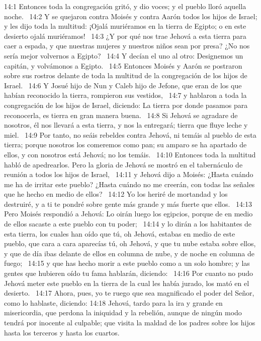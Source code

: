 14:1 Entonces toda la congregación gritó, y dio voces; y el pueblo lloró aquella noche.  
14:2 Y se quejaron contra Moisés y contra Aarón todos los hijos de Israel; y les dijo toda la multitud: ¡Ojalá muriéramos en la tierra de Egipto; o en este desierto ojalá muriéramos!  
14:3 ¿Y por qué nos trae Jehová a esta tierra para caer a espada, y que nuestras mujeres y nuestros niños sean por presa? ¿No nos sería mejor volvernos a Egipto?  
14:4 Y decían el uno al otro: Designemos un capitán, y volvámonos a Egipto.  
14:5 Entonces Moisés y Aarón se postraron sobre sus rostros delante de toda la multitud de la congregación de los hijos de Israel.  
14:6 Y Josué hijo de Nun y Caleb hijo de Jefone, que eran de los que habían reconocido la tierra, rompieron sus vestidos,  
14:7 y hablaron a toda la congregación de los hijos de Israel, diciendo: La tierra por donde pasamos para reconocerla, es tierra en gran manera buena.  
14:8 Si Jehová se agradare de nosotros, él nos llevará a esta tierra, y nos la entregará; tierra que fluye leche y miel.  
14:9 Por tanto, no seáis rebeldes contra Jehová, ni temáis al pueblo de esta tierra; porque nosotros los comeremos como pan; su amparo se ha apartado de ellos, y con nosotros está Jehová; no los temáis.  
14:10 Entonces toda la multitud habló de apedrearlos. Pero la gloria de Jehová se mostró en el tabernáculo de reunión a todos los hijos de Israel,  
14:11 y Jehová dijo a Moisés: ¿Hasta cuándo me ha de irritar este pueblo? ¿Hasta cuándo no me creerán, con todas las señales que he hecho en medio de ellos?  
14:12 Yo los heriré de mortandad y los destruiré, y a ti te pondré sobre gente más grande y más fuerte que ellos.  
14:13 Pero Moisés respondió a Jehová: Lo oirán luego los egipcios, porque de en medio de ellos sacaste a este pueblo con tu poder;  
14:14 y lo dirán a los habitantes de esta tierra, los cuales han oído que tú, oh Jehová, estabas en medio de este pueblo, que cara a cara aparecías tú, oh Jehová, y que tu nube estaba sobre ellos, y que de día ibas delante de ellos en columna de nube, y de noche en columna de fuego;  
14:15 y que has hecho morir a este pueblo como a un solo hombre; y las gentes que hubieren oído tu fama hablarán, diciendo:  
14:16 Por cuanto no pudo Jehová meter este pueblo en la tierra de la cual les había jurado, los mató en el desierto.  
14:17 Ahora, pues, yo te ruego que sea magnificado el poder del Señor, como lo hablaste, diciendo: 
14:18 Jehová, tardo para la ira y grande en misericordia, que perdona la iniquidad y la rebelión, aunque de ningún modo tendrá por inocente al culpable; que visita la maldad de los padres sobre los hijos hasta los terceros y hasta los cuartos.  
